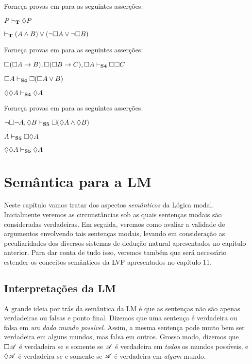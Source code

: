 \problempart
Forneça provas em  \mlT{} para as seguintes asserções:
\begin{earg}
	\item $P\vdash_{\mathbf{T}}\Diamond P$
	\item $\vdash_{\mathbf{T}} (A\wedge B)\vee(\neg \Box A\vee\neg\Box B)$
\end{earg}

\problempart
Forneça provas em  \mlSfour{}  para as seguintes asserções:
\begin{earg}
	\item $\Box(\Box A\rightarrow B), \Box (\Box B\rightarrow C), \Box A \vdash_{\mathbf{S4}} \Box\Box C$
	\item $\Box A \vdash_{\mathbf{S4}} \Box(\Box A \vee B)$
	\item $\Diamond \Diamond A \vdash_{\mathbf{S4}} \Diamond A$
\end{earg}

\problempart
Forneça provas em \mlSfive{} para as seguintes asserções:
\begin{earg}
	\item $\neg\Box\neg A, \Diamond B\vdash_{\mathbf{S5}} \Box(\Diamond A \wedge \Diamond B)$
	\item $A \vdash_{\mathbf{S5}}  \Box\Diamond A$
	\item $\Diamond\Diamond A\vdash_{\mathbf{S5}}  \Diamond A$
\end{earg}

\chapter{Semântica para  a  LM}
\label{Semantics}

Neste capítulo vamos tratar dos aspectos \emph{semânticos} da Lógica modal.  Inicialmente veremos as circunstâncias sob as quais sentenças modais são consideradas verdadeiras. Em seguida, veremos como avaliar a validade de argumentos envolvendo tais sentenças modais, levando em consideração as peculiaridades dos diversos sistemas  de  dedução natural  apresentados no capítulo anterior. Para dar conta de tudo isso, veremos também  que será necessário  estender os conceitos semânticos da LVF apresentados no capítulo 11. 

\section{Interpretações da LM}

A grande ideia por trás da semântica da LM é que as sentenças não são apenas verdadeiras ou falsas e ponto final.  Dizemos que uma  sentença é verdadeira ou falsa em \emph{um dado mundo possível}. Assim,  a mesma sentença pode muito bem ser verdadeira em alguns mundos,  mas falsa em outros. Grosso modo, dizemos que $\Box \mathscr{A}$ é verdadeira   se e somente se $\mathscr{A}$ é verdadeira em \emph{todos} os mundos possíveis, e $\Diamond\mathscr{A}$ é verdadeira se e somente se  $\mathscr{A}$ é verdadeira em \emph{algum} mundo.

